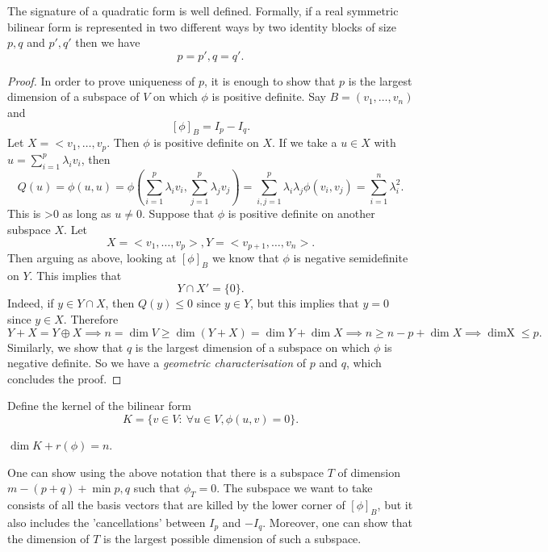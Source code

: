 \documentclass[a4paper]{scrartcl}
\begin{document}
\begin{theorem}
    The signature of a quadratic form is well defined. \newline 
     Formally, if a real symmetric bilinear form is represented in two different ways by two identity blocks of size $p,q$ and $p',q'$ then we have 
     \[p=p',q=q'.\]
\end{theorem}
\begin{proof}
     In order to prove uniqueness of $p$, it is enough to show that $p$ is the largest dimension of a subspace of $V$ on which $\phi $ is positive definite. Say $B=(v_1, \ldots , v_n)$ and 
     \[[\phi]_B=I_p -I_q.\]
     Let $X=<v_1,\ldots ,v_p$. Then $\phi $ is positive definite on $X$. If we take a $u \in X$ with $u=\sum_{i=1}^{p}\lambda_i v_i$, then 
     \[Q(u)= \phi (u,u)=\phi(\sum_{i=1}^{p}\lambda_i v_i,\sum_{j=1}^{p}\lambda_j v_j)=\sum_{i,j=1}^{p}\lambda_i \lambda_j \phi (v_i,v_j)= \sum_{i=1}^{n} \lambda_i^2 .\]
     This is >0 as long as $u \neq 0$. Suppose that $\phi $ is positive definite on another subspace $X$. Let 
     \[X=<v_1,\ldots ,v_p> , Y=<v_{p+1},\ldots ,v_n>.\]
     Then arguing as above, looking at $[\phi]_B$ we know that $\phi$ is negative semidefinite on $Y$. This implies that 
     \[Y \cap X'=\{0\}.\] Indeed, if $y \in Y \cap X$, then $Q(y)\leq 0$ since $y \in Y$, but this implies that $y=0$ since $y \in X$. Therefore 
     \[Y+X= Y \oplus X \implies n=\operatorname{dim} V \geq \operatorname{dim} (Y+X) =\operatorname{dim}Y +\operatorname{dim}X \implies n \geq n-p+\operatorname{dim}X \implies \operatorname{dim X} \leq p.\]
     Similarly, we show that $q$ is the largest dimension of a subspace on which $\phi$ is negative definite. So we have a \emph{geometric characterisation} of $p$ and $q$, which concludes the proof.
\end{proof}

\begin{definition}
     Define the kernel of the bilinear form
     \[K=\{v \in V : \ \forall u \in V, \phi (u,v)=0 \}.\]
\end{definition}
\begin{remark}
     $\operatorname{dim} K + r (\phi)=n$.
\end{remark}
One can show using the above notation that there is a subspace $T$ of dimension $m-(p+q)+\min p,q$ such that $\phi_T=0$. The subspace we want to take consists of all the basis vectors that are killed by the lower corner of $[\phi]_B$, but it also includes the 'cancellations' between $I_p$ and $-I_q$.\newline 
Moreover, one can show that the dimension of $T$ is the largest possible dimension of such a subspace.
\end{document}
